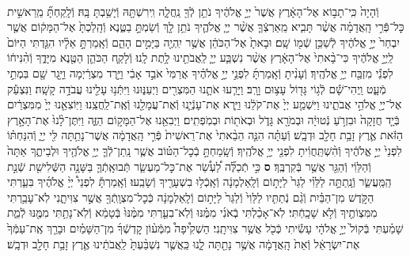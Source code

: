 \documentclass[twoside, openany, parskip=half, 11pt]{book}
\begin{document}
\begin{footnotesize}
\begin{multicols}{2}
\\
וְֿהָיָה֙ כִּֽי־תָב֣וֹא אֶל־הָאָ֔רֶץ אֲשֶׁר֙ יְיָ֣ אֱלֹהֶ֔יךָ נֹתֵ֥ן לְֿךָ֖ נַֽחֲלָ֑ה וִֽירִשְׁתָּ֖הּ וְֿיָשַׁ֥בְתָּ בָּֽהּ׃ וְֿלָֽקַחְתָּ֞ מֵֽרֵאשִׁ֣ית כׇּל־פְּֿֿרִ֣י הָֽאֲדָמָ֗ה אֲשֶׁ֨ר תָּבִ֧יא מֵֽאַרְצְֿךָ֛ אֲשֶׁ֨ר יְיָ֧ אֱלֹהֶ֛יךָ נֹתֵ֥ן לָ֖ךְ וְֿשַׂמְתָּ֣ בַטֶּ֑נֶא וְֿהָֽלַכְתָּ֙ אֶל־הַמָּק֔וֹם אֲשֶׁ֤ר יִבְחַר֙ יְיָ֣ אֱלֹהֶ֔יךָ לְֿשַׁכֵּ֥ן שְֿׁמ֖וֹ שָֽׁם׃ וּבָאתָ֙ אֶל־הַכֹּהֵ֔ן אֲשֶׁ֥ר יִֽהְיֶ֖ה בַּיָּמִ֣ים הָהֵ֑ם וְֿאָֽמַרְתָּ֣ אֵלָ֗יו הִגַּ֤דְתִּי הַיּוֹם֙ לַֽיְיָ֣ אֱלֹהֶ֔יךָ כִּי־בָ֨אתִי֙ אֶל־הָאָ֔רֶץ אֲשֶׁ֨ר נִשְׁבַּ֧ע יְיָ֛ לַֽאֲבֹתֵ֖ינוּ לָ֥תֶת לָֽנוּ׃
וְֿלָקַ֧ח הַכֹּהֵ֛ן הַטֶּ֖נֶא מִיָּדֶ֑ךָ וְֿהִ֨נִּיח֔וֹ לִפְנֵ֕י מִזְבַּ֖ח יְיָ֥ אֱלֹהֶֽיךָ׃ וְֿעָנִ֨יתָ וְֿאָֽמַרְתָּ֜ לִפְנֵ֣י יְיָ֣ אֱלֹהֶ֗יךָ אֲרַמִּי֙ אֹבֵ֣ד אָבִ֔י וַיֵּ֣רֶד מִצְרַ֔יְמָה וַיָּ֥גָר שָׁ֖ם בִּמְתֵ֣י מְֿעָ֑ט וַֽיְהִי־שָׁ֕ם לְֿג֥וֹי גָּד֖וֹל עָצ֥וּם וָרָֽב׃ וַיָּרֵ֧עוּ אֹתָ֛נוּ הַמִּצְרִ֖ים וַיְעַנּ֑וּנוּ וַיִּתְּֿנ֥וּ עָלֵ֖ינוּ עֲבֹדָ֥ה קָשָֽׁה׃ וַנִּצְעַ֕ק אֶל־יְיָ֖ אֱלֹהֵ֣י אֲבֹתֵ֑ינוּ וַיִּשְׁמַ֤ע יְיָ֙ אֶת־קֹלֵ֔נוּ וַיַּ֧רְא אֶת־עָנְֿיֵ֛נוּ וְֿאֶת־עֲמָלֵ֖נוּ וְֿאֶֽת־לַֽחֲצֵֽנוּ׃ וַיּֽוֹצִאֵ֤נוּ יְיָ֙ מִמִּצְרַ֔יִם בְּֿיָ֤ד חֲזָקָה֙ וּבִזְרֹ֣עַ נְֿטוּיָ֔ה וּבְמֹרָ֖א גָּדֹ֑ל וּבְאֹת֖וֹת וּבְמֹֽפְתִֽים׃ וַיְבִאֵ֖נוּ אֶל־הַמָּק֣וֹם הַזֶּ֑ה וַיִּתֶּן־לָ֨נוּ֙ אֶת־הָאָ֣רֶץ הַזֹּ֔את אֶ֛רֶץ זָבַ֥ת חָלָ֖ב וּדְבָֽשׁ׃ וְֿעַתָּ֗ה הִנֵּ֤ה הֵבֵ֨אתִי֙ אֶת־רֵאשִׁית֙ פְּֿרִ֣י הָֽאֲדָמָ֔ה אֲשֶׁר־נָתַ֥תָּה לִּ֖י יְיָ֑ וְֿהִנַּחְתּ֗וֹ לִפְנֵי֙ יְיָ֣ אֱלֹהֶ֔יךָ וְֿהִ֨שְׁתַּֽחֲוִ֔יתָ לִפְנֵ֖י יְיָ֥ אֱלֹהֶֽיךָ׃ וְֿשָֽׂמַחְתָּ֣ בְֿכׇל־הַטּ֗וֹב אֲשֶׁ֧ר נָֽתַן־לְֿךָ֛ יְיָ֥ אֱלֹהֶ֖יךָ וּלְבֵיתֶ֑ךָ אַתָּה֙ וְֿהַלֵּוִ֔י וְֿהַגֵּ֖ר אֲשֶׁ֥ר בְּֿקִרְבֶּֽךָ׃ \textbf{ס}
כִּ֣י תְֿכַלֶּ֞ה לַ֠עְשֵׂ֠ר אֶת־כׇּל־מַעְשַׂ֧ר תְּֿבוּאָֽתְֿךָ֛ בַּשָּׁנָ֥ה הַשְּֿׁלִישִׁ֖ת שְֿׁנַ֣ת הַֽמַּֽעֲשֵׂ֑ר וְֿנָֽתַתָּ֣ה לַלֵּוִ֗י לַגֵּר֙ לַיָּת֣וֹם וְֿלָֽאַלְמָנָ֔ה וְֿאָֽכְֿל֥וּ בִשְׁעָרֶ֖יךָ וְֿשָׂבֵֽעוּ׃ וְֿאָֽמַרְתָּ֡ לִפְנֵי֩ יְיָ֨ אֱלֹהֶ֜יךָ בִּעַ֧רְתִּי הַקֹּ֣דֶשׁ מִן־הַבַּ֗יִת וְֿגַ֨ם נְֿתַתִּ֤יו לַלֵּוִי֙ וְֿלַגֵּר֙ לַיָּת֣וֹם וְֿלָֽאַלְמָנָ֔ה כְּֿכׇל־מִצְוָֽתְֿךָ֖ אֲשֶׁ֣ר צִוִּיתָ֑נִי לֹֽא־עָבַ֥רְתִּי מִמִּצְוֹתֶ֖יךָ וְֿלֹ֥א שָׁכָֽחְֿתִּי׃ לֹֽא־אָכַ֨לְתִּי בְֿאֹנִ֜י מִמֶּ֗נּוּ וְֿלֹֽא־בִעַ֤רְתִּי מִמֶּ֨נּוּ֙ בְּֿטָמֵ֔א וְֿלֹֽא־נָתַ֥תִּי מִמֶּ֖נּוּ לְֿמֵ֑ת שָׁמַ֗עְתִּי בְּֿקוֹל֙ יְיָ֣ אֱלֹהָ֔י עָשִׂ֕יתִי כְּֿכֹ֖ל אֲשֶׁ֥ר צִוִּיתָֽנִי׃ הַשְׁקִ֩יפָה֩ מִמְּֿע֨וֹן קׇדְשְֿׁךָ֜ מִן־הַשָּׁמַ֗יִם וּבָרֵ֤ךְ אֶֽת־עַמְּֿךָ֙ אֶת־יִשְׂרָאֵ֔ל וְֿאֵת֙ הָֽאֲדָמָ֔ה אֲשֶׁ֥ר נָתַ֖תָּה לָ֑נוּ כַּֽאֲשֶׁ֤ר נִשְׁבַּ֨עְתָּ֙ לַֽאֲבֹתֵ֔ינוּ אֶ֛רֶץ זָבַ֥ת חָלָ֖ב וּדְבָֽשׁ׃


\end{multicols}
\end{footnotesize}
\end{document}
